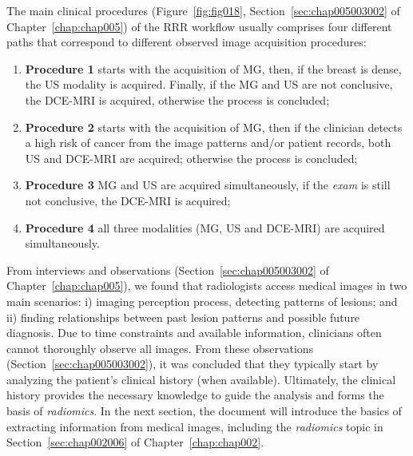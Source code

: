 \vspace{1.50mm}

\noindent
The main clinical procedures \textcolor{revised}{(Figure~\ref{fig:fig018}, Section~\ref{sec:chap005003002} of Chapter~\ref{chap:chap005})} of the \ac{RRR} workflow usually comprises four different paths that correspond to different observed image acquisition procedures:

\vspace{0.05mm}

\begin{enumerate}
\item \textbf{Procedure 1} starts with the acquisition of \ac{MG}, then, if the breast is dense, the \ac{US} modality is acquired. Finally, if the \ac{MG} and \ac{US} are not conclusive, the \ac{DCE}-\ac{MRI} is acquired, otherwise the process is concluded;
\item \textbf{Procedure 2} starts with the acquisition of \ac{MG}, then if the clinician detects a high risk of cancer from the image patterns and/or patient records, both \ac{US} and \ac{DCE}-\ac{MRI} are acquired; otherwise the process is concluded;
\item \textbf{Procedure 3} \ac{MG} and \ac{US} are acquired simultaneously, if the {\it exam} is still not conclusive, the \ac{DCE}-\ac{MRI} is acquired;
\item \textbf{Procedure 4} all three modalities (\ac{MG}, \ac{US} and \ac{DCE}-\ac{MRI}) are acquired simultaneously.
\end{enumerate}

\textcolor{revised}{From interviews and observations (Section~\ref{sec:chap005003002} of Chapter~\ref{chap:chap005}), we found that radiologists access medical images in two main scenarios:
i) imaging perception process, detecting patterns of lesions;
and ii) finding relationships between past lesion patterns and possible future diagnosis.
Due to time constraints and available information, clinicians often cannot thoroughly observe all images.
From these observations (Section~\ref{sec:chap005003002}), it was concluded that they typically start by analyzing the patient's clinical history (when available).
Ultimately, the clinical history provides the necessary knowledge to guide the analysis and forms the basis of {\it radiomics}.
In the next section, the document will introduce the basics of extracting information from medical images, including the {\it radiomics} topic in Section~\ref{sec:chap002006} of Chapter~\ref{chap:chap002}.}

